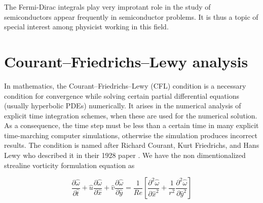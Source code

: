 \documentclass{article}
\begin{document}
The Fermi-Dirac integrals play very improtant role in the study of semiconductors appear frequently in semiconductor problems. It is thus a topic of special interest among physicist working in this field.

\section{Courant–Friedrichs–Lewy analysis}
In mathematics, the Courant–Friedrichs–Lewy (CFL) condition is a necessary condition for convergence while solving certain partial differential equations (usually hyperbolic PDEs) numerically. It arises in the numerical analysis of explicit time integration schemes, when these are used for the numerical solution. As a consequence, the time step must be less than a certain time in many explicit time-marching computer simulations, otherwise the simulation produces incorrect results. The condition is named after Richard Courant, Kurt Friedrichs, and Hans Lewy who described it in their 1928 paper \citep{cfl}.
We have the non dimentionalized strealine vorticity formulation equation as

\begin{equation}
\frac{\partial \hat{\omega}}{\partial \hat{t}} + \hat{u}\frac{\partial \hat{\omega}}{\partial \hat{x}} +\hat{ v}\frac{\partial \hat{\omega}}{\partial \hat{y}}= \frac{1}{Re} \left [ \frac{\partial^2 \hat{\omega}}{\partial \hat{x}^2} +  \frac{1}{r^2}\frac{\partial^2 \hat{\omega}}{\partial \hat{y}^2} \right ]
\end{equation}
\end{document}
